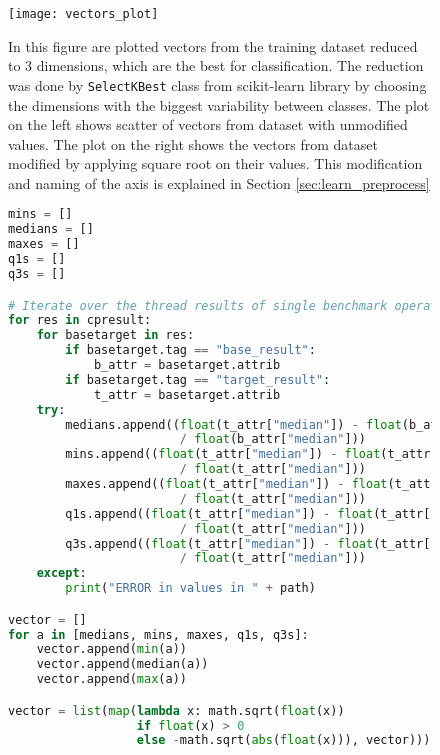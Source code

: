 \begin{figure}
  \centering
  \texttt{[image: vectors\_plot]}
  \caption{In this figure are plotted vectors from the training dataset reduced
    to 3 dimensions, which are the best for classification. The reduction was done by
    \texttt{SelectKBest} class from scikit-learn library by choosing the
    dimensions with the biggest variability between classes. The plot on the
    left shows scatter of vectors from dataset with unmodified values. The plot
    on the right shows the vectors from dataset modified by applying square root
    on their values. This modification and naming of the axis is explained in
    Section \ref{sec:learn_preprocess}}
  \label{fig:vectors_plot}
\end{figure}

\begin{figure}
  \small
  \begin{lstlisting}[language=Python]
mins = []
medians = []
maxes = []
q1s = []
q3s = []

# Iterate over the thread results of single benchmark operation
for res in cpresult:
    for basetarget in res:
        if basetarget.tag == "base_result":
            b_attr = basetarget.attrib
        if basetarget.tag == "target_result":
            t_attr = basetarget.attrib
    try:
        medians.append((float(t_attr["median"]) - float(b_attr["median"]))
                        / float(b_attr["median"]))
        mins.append((float(t_attr["median"]) - float(t_attr["min"]))
                        / float(t_attr["median"]))
        maxes.append((float(t_attr["median"]) - float(t_attr["max"]))
                        / float(t_attr["median"]))
        q1s.append((float(t_attr["median"]) - float(t_attr["first_q"]))
                        / float(t_attr["median"]))
        q3s.append((float(t_attr["median"]) - float(t_attr["third_q"]))
                        / float(t_attr["median"]))
    except:
        print("ERROR in values in " + path)

vector = []
for a in [medians, mins, maxes, q1s, q3s]:
    vector.append(min(a))
    vector.append(median(a))
    vector.append(max(a))

vector = list(map(lambda x: math.sqrt(float(x))
                  if float(x) > 0
                  else -math.sqrt(abs(float(x))), vector)))
  \end{lstlisting}
  \normalsize
  \caption{}
  \label{fig:learn_preprocess}
\end{figure}

